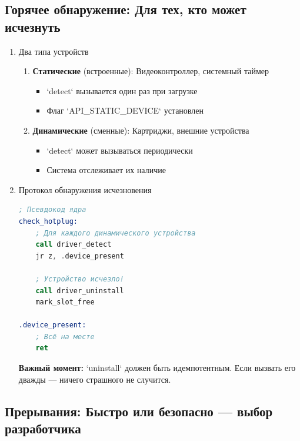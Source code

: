 \documentclass[11pt,a4paper]{scrartcl}
\begin{document}
\subsection{Горячее обнаружение: Для тех, кто может исчезнуть}
\label{sec:org9ce0c94}

\begin{enumerate}
\item Два типа устройств
\label{sec:org273910b}

\begin{enumerate}
\item \textbf{Статические} (встроенные): Видеоконтроллер, системный таймер
\begin{itemize}
\item `detect` вызывается один раз при загрузке
\item Флаг `API\_STATIC\_DEVICE` установлен
\end{itemize}

\item \textbf{Динамические} (сменные): Картриджи, внешние устройства
\begin{itemize}
\item `detect` может вызываться периодически
\item Система отслеживает их наличие
\end{itemize}
\end{enumerate}
\item Протокол обнаружения исчезновения
\label{sec:org3f8233c}

\begin{lstlisting}[language=asm,numbers=none]
; Псевдокод ядра
check_hotplug:
    ; Для каждого динамического устройства
    call driver_detect
    jr z, .device_present
    
    ; Устройство исчезло!
    call driver_uninstall
    mark_slot_free
    
.device_present:
    ; Всё на месте
    ret
\end{lstlisting}

\textbf{Важный момент:} `uninstall` должен быть идемпотентным. Если вызвать его дважды — ничего страшного не случится.
\end{enumerate}
\subsection{Прерывания: Быстро или безопасно — выбор разработчика}
\label{sec:org85a2672}
\end{document}
